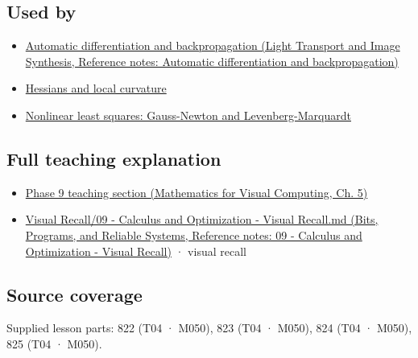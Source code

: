 \subsection{Used by}\label{appendix-d8a7ddb675eb-used-by}

\begin{itemize}
\tightlist
\item
  \href{../04-Light-Transport-and-Image-Synthesis/main.pdf\#nameddest=appendix-40df0855b4a7}{Automatic differentiation and backpropagation (Light Transport and Image Synthesis, Reference notes: Automatic differentiation and backpropagation)}
\item
  \hyperref[appendix-6ac071f8b50c]{Hessians and local curvature}
\item
  \hyperref[appendix-2c2df8345991]{Nonlinear least squares: Gauss-Newton and Levenberg-Marquardt}
\end{itemize}

\subsection{Full teaching explanation}\label{appendix-d8a7ddb675eb-full-teaching-explanation}

\begin{itemize}
\tightlist
\item
  \href{../02-Mathematics-for-Visual-Computing/main.pdf\#nameddest=02-foundations-ii-ch021-jacobians-curvature-and-local-approximation}{Phase 9 teaching section (Mathematics for Visual Computing, Ch. 5)}
\item
  \href{../01-Bits-Programs-and-Reliable-Systems/main.pdf\#nameddest=appendix-adf48f5dc5c1}{Visual Recall/09 - Calculus and Optimization - Visual Recall.md (Bits, Programs, and Reliable Systems, Reference notes: 09 - Calculus and Optimization - Visual Recall)} · visual recall
\end{itemize}

\subsection{Source coverage}\label{appendix-d8a7ddb675eb-source-coverage}

Supplied lesson parts: 822 (T04 · M050), 823 (T04 · M050), 824 (T04 · M050), 825 (T04 · M050).
